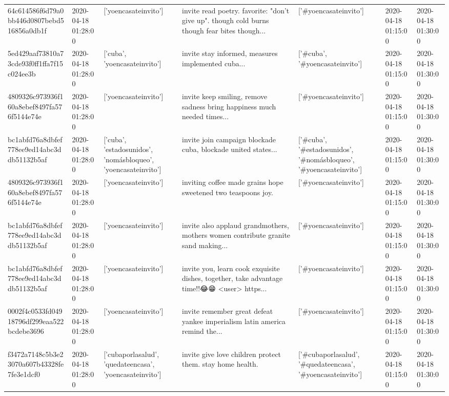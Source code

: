 \begin{tabular}{lllllll}
64c614586f6d79a0bb446d0807bebd516856a0db1f & 2020-04-18 01:28:00 & ['yoencasateinvito'] & invite read poetry. favorite: "don't give up". though cold burns though fear bites though... & ['#yoencasateinvito'] & 2020-04-18 01:15:00 & 2020-04-18 01:30:00 \\
5ed429aaf73810a73cde93f0ff1ffa7f15c024ee3b & 2020-04-18 01:28:00 & ['cuba', 'yoencasateinvito'] & invite stay informed, measures implemented cuba... & ['#cuba', '#yoencasateinvito'] & 2020-04-18 01:15:00 & 2020-04-18 01:30:00 \\
4809326c973936f160a8ebef8497fa576f5144e74e & 2020-04-18 01:28:00 & ['yoencasateinvito'] & invite keep smiling, remove sadness bring happiness much needed times... & ['#yoencasateinvito'] & 2020-04-18 01:15:00 & 2020-04-18 01:30:00 \\
bc1abfd76a8dbfef778ee9ed14abc3ddb51132b5af & 2020-04-18 01:28:00 & ['cuba', 'estadosunidos', 'nomásbloqueo', 'yoencasateinvito'] & invite join campaign blockade cuba, blockade united states... & ['#cuba', '#estadosunidos', '#nomásbloqueo', '#yoencasateinvito'] & 2020-04-18 01:15:00 & 2020-04-18 01:30:00 \\
4809326c973936f160a8ebef8497fa576f5144e74e & 2020-04-18 01:28:00 & ['yoencasateinvito'] & inviting coffee made grains hope sweetened two teaspoons joy. & ['#yoencasateinvito'] & 2020-04-18 01:15:00 & 2020-04-18 01:30:00 \\
bc1abfd76a8dbfef778ee9ed14abc3ddb51132b5af & 2020-04-18 01:28:00 & ['yoencasateinvito'] & invite also applaud grandmothers, mothers women contribute granite sand making... & ['#yoencasateinvito'] & 2020-04-18 01:15:00 & 2020-04-18 01:30:00 \\
bc1abfd76a8dbfef778ee9ed14abc3ddb51132b5af & 2020-04-18 01:28:00 & ['yoencasateinvito'] & invite you, learn cook exquisite dishes, together, take advantage time!!😂😁 <user> https... & ['#yoencasateinvito'] & 2020-04-18 01:15:00 & 2020-04-18 01:30:00 \\
0002f4c0533fd04918796df299eaa522bcdebe3696 & 2020-04-18 01:28:00 & ['yoencasateinvito'] & invite remember great defeat yankee imperialism latin america remind the... & ['#yoencasateinvito'] & 2020-04-18 01:15:00 & 2020-04-18 01:30:00 \\
f3472a7148c5b3e23070a607b43328fe7fe3e1dcf0 & 2020-04-18 01:28:00 & ['cubaporlasalud', 'quedateencasa', 'yoencasateinvito'] & invite give love children protect them. stay home health. & ['#cubaporlasalud', '#quedateencasa', '#yoencasateinvito'] & 2020-04-18 01:15:00 & 2020-04-18 01:30:00 \\

\end{tabular}
